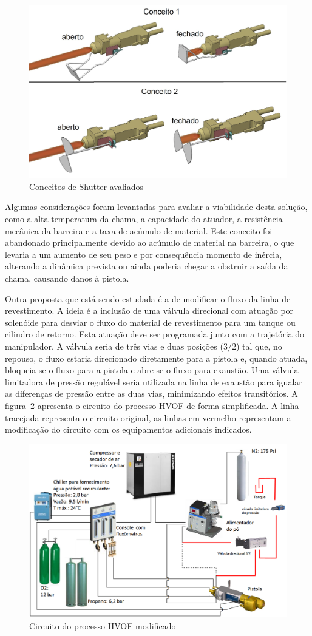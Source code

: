 \begin{figure}[h!]
   \centering
   \includegraphics[width=0.8\columnwidth]{figs/shutter/shutter_todos}
   \caption{Conceitos de Shutter avaliados}
   \label{fig::shutter_todos}
\end{figure}

Algumas considerações foram levantadas para avaliar a viabilidade
desta solução, como a alta temperatura da chama, a capacidade do atuador, a
resistência mecânica da barreira e a taxa de acúmulo de material. Este conceito
foi abandonado principalmente devido ao acúmulo de material na barreira, o que
levaria a um aumento de seu peso e por consequência momento de inércia,
alterando a dinâmica prevista ou ainda poderia chegar a obstruir a saída da
chama, causando danos à pistola.

Outra proposta que está sendo estudada é a de modificar o fluxo da linha de
revestimento. A ideia é a inclusão de uma válvula direcional com atuação por
solenóide para desviar o fluxo do material de revestimento para um tanque ou
cilindro de retorno. Esta atuação deve ser programada junto com a trajetória do 
manipulador. A válvula seria de três vias e duas posições ($3/2$) tal que, no 
repouso, o fluxo estaria direcionado diretamente para a pistola e, quando
atuada, bloqueia-se o fluxo para a pistola e abre-se o fluxo para exaustão. Uma
válvula limitadora de pressão regulável seria utilizada na linha de exaustão
para igualar as diferenças de pressão entre as duas vias, minimizando efeitos transitórios.
A figura~\ref{fig::circuito_hvof} apresenta o circuito do processo HVOF de forma
simplificada.
A linha tracejada representa o circuito original, as linhas em vermelho
representam a modificação do circuito com os equipamentos adicionais indicados.

 \begin{figure}[h!]
   \centering
   \includegraphics[width=0.8\columnwidth]{figs/shutter/Circuito_HVOF_mod}
   \caption{Circuito do processo HVOF modificado}
   \label{fig::circuito_hvof}
\end{figure}